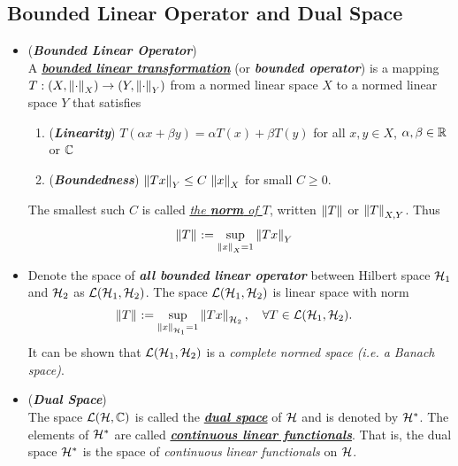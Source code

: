 \documentclass[11pt]{article}
\begin{document}
\subsection{Bounded Linear Operator and Dual Space}
\begin{itemize}
\item \begin{definition} (\emph{\textbf{Bounded Linear Operator}})\\
A \underline{\emph{\textbf{bounded linear transformation}}} (or \emph{\textbf{bounded operator}}) is a mapping $T: (X, \left\|\cdot\right\|_{X}) \rightarrow (Y, \left\|\cdot\right\|_{Y})$ from a normed linear space $X$ to a normed linear space $Y$ that satisfies 
\begin{enumerate}
\item (\emph{\textbf{Linearity}}) $T(\alpha x + \beta y) = \alpha T(x) + \beta T(y)$ for all $x, y \in X$, $\alpha, \beta \in {\mathbb R}$ or ${\mathbb C}$
\item (\emph{\textbf{Boundedness}}) $\left\|Tx\right\|_{Y} \le C\,\left\|x\right\|_{X}$ for small $C \ge 0$.
\end{enumerate} The smallest such $C$ is called \underline{\emph{the \textbf{norm} of $T$}}, written $\left\|T\right\|_{}$ or $\left\|T\right\|_{X, Y}$. Thus
\begin{align*}
\left\|T\right\|_{} &:= \sup_{\left\|x\right\|_{X} = 1 }\left\|Tx\right\|_{Y}
\end{align*}
\end{definition}

\item \begin{remark}
Denote the space of \emph{\textbf{all bounded linear operator}} between Hilbert space ${\mathcal H}_1$ and ${\mathcal H}_2$ as ${\mathcal L}({\mathcal H}_1, {\mathcal H}_2)$. The space ${\mathcal L}({\mathcal H}_1, {\mathcal H}_2)$ is linear space with norm 
\begin{align*}
\left\|T\right\|_{} &:= \sup_{\left\|x\right\|_{{\mathcal H}_1} = 1 }\left\|Tx\right\|_{{\mathcal H}_2}, \quad \forall T \in {\mathcal L}({\mathcal H}_1, {\mathcal H}_2).
\end{align*} It can be shown that ${\mathcal L}({\mathcal H}_1, {\mathcal H}_2)$ is a \emph{complete normed space (i.e. a Banach space)}.
\end{remark}

\item \begin{definition} (\emph{\textbf{Dual Space}})\\
The space ${\mathcal L}({\mathcal H}, {\mathbb C})$ is called the \underline{\emph{\textbf{dual space}}} of ${\mathcal H}$ and is denoted by ${\mathcal H}^{*}$. The elements of ${\mathcal H}^{*}$ are called \underline{\emph{\textbf{continuous linear functionals}}}. That is, the dual space ${\mathcal H}^{*}$ is the space of \emph{continuous linear functionals} on ${\mathcal H}$. 
\end{definition}


\end{itemize}
\end{document}
